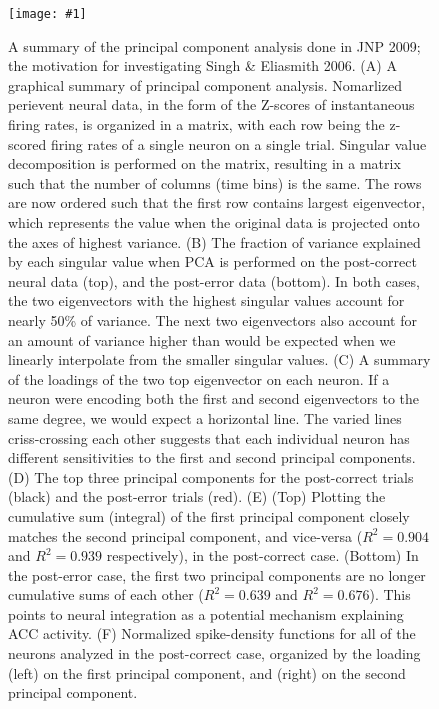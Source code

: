 \documentclass[11pt]{article}
\newcommand{\scalefigone}[3]{
  \begin{figure}[ht!]
    \centering
    \texttt{[image: \#1]}
    \caption{#3}
    \label{#1}
  \end{figure}}
\begin{document}
\scalefigone{fig3}{1.0}{
  A summary of the principal component analysis done
  in JNP 2009;
  the motivation for investigating Singh \& Eliasmith 2006.
  (A) A graphical summary of principal component analysis.
  Nomarlized perievent neural data,
  in the form of the Z-scores of instantaneous firing rates,
  is organized in a matrix, with each row
  being the z-scored firing rates
  of a single neuron on a single trial.
  Singular value decomposition is performed on the matrix,
  resulting in a matrix such that
  the number of columns (time bins) is the same.
  The rows are now ordered such that the first row
  contains largest eigenvector,
  which represents the value when the original
  data is projected onto the axes of highest variance.
  (B) The fraction of variance explained
  by each singular value
  when PCA is performed on the post-correct neural data
  (top), and the post-error data (bottom).
  In both cases, the two eigenvectors with the highest
  singular values account for nearly 50\% of variance.
  The next two eigenvectors also account for an amount
  of variance higher than would be expected when
  we linearly interpolate from the smaller
  singular values.
  (C) A summary of the loadings of the two top
  eigenvector on each neuron.
  If a neuron were encoding both the first and second
  eigenvectors to the same degree,
  we would expect a horizontal line.
  The varied lines criss-crossing each other
  suggests that each individual neuron
  has different sensitivities
  to the first and second principal components.
  (D) The top three principal components
  for the post-correct trials (black)
  and the post-error trials (red).
  (E) (Top) Plotting the cumulative sum (integral)
  of the first principal component closely matches
  the second principal component, and vice-versa
  ($R^2 = 0.904$ and $R^2 = 0.939$ respectively),
  in the post-correct case.
  (Bottom) In the post-error case,
  the first two principal components are no longer
  cumulative sums of each other
  ($R^2 = 0.639$ and $R^2 = 0.676$).
  This points to neural integration
  as a potential mechanism explaining ACC activity.
  (F) Normalized spike-density functions
  for all of the neurons analyzed in the post-correct case,
  organized by the loading
  (left) on the first principal component, and
  (right) on the second principal component.
}
\end{document}
